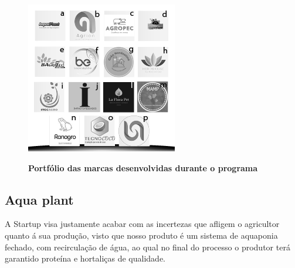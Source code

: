 


\begin{figure}[H]
\centering
\caption{\textbf{Portfólio das marcas desenvolvidas durante o programa}}
\includegraphics[scale=3]{Imagens/portfolio.png}
\label{figura_12}
\end{figure}


\subsection{Aqua plant}



A Startup visa justamente acabar com as incertezas que  afligem o agricultor quanto á sua produção, visto que nosso produto é um sistema de aquaponia fechado, com recirculação de água, ao qual no final do processo o produtor terá garantido proteína e hortaliças de qualidade. 

